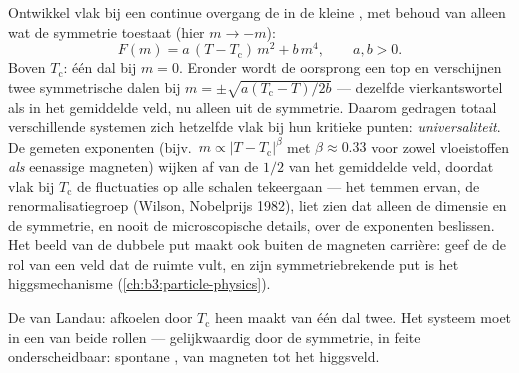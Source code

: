 \begin{proposition}[Landautheorie]\label{prop:b3:phase-transitions:landau}
Ontwikkel vlak bij een continue overgang de  in de kleine
, met behoud van alleen wat de symmetrie toestaat (hier
$m \to -m$):
\[
F(m) = a\,(T - T_{\text{c}})\,m^2 + b\,m^4 , \qquad a, b > 0 .
\]
Boven $T_{\text{c}}$: één dal bij $m = 0$. Eronder wordt de oorsprong
een top en verschijnen twee symmetrische dalen bij $m = \pm
\sqrt{a(T_{\text{c}} - T)/2b}$ --- dezelfde vierkantswortel als in het
gemiddelde veld, nu alleen uit de symmetrie. Daarom gedragen totaal
verschillende systemen zich hetzelfde vlak bij hun kritieke punten:
\emph{universaliteit}. De gemeten exponenten (bijv.\ $m \propto |T -
T_{\text{c}}|^\beta$ met $\beta \approx 0.33$ voor zowel vloeistoffen
\emph{als} eenassige magneten) wijken af van de $1/2$ van het gemiddelde
veld, doordat vlak bij $T_{\text{c}}$ de fluctuaties op alle schalen
tekeergaan --- het temmen ervan, de renormalisatiegroep (Wilson,
Nobelprijs 1982), liet zien dat alleen de dimensie en de symmetrie, en
nooit de microscopische details, over de exponenten beslissen. Het
beeld van de dubbele put maakt ook buiten de magneten carrière: geef de
 de rol van een veld dat de ruimte vult, en zijn
symmetriebrekende put is het higgsmechanisme
(\cref{ch:b3:particle-physics}).
\end{proposition}
\admitted

\begin{omfigure}

{\small De  van Landau: afkoelen door $T_{\text{c}}$ heen
maakt van één dal twee. Het systeem moet in een van beide rollen ---
gelijkwaardig door de symmetrie, in feite onderscheidbaar: spontane
, van magneten tot het higgsveld.}
\end{omfigure}

